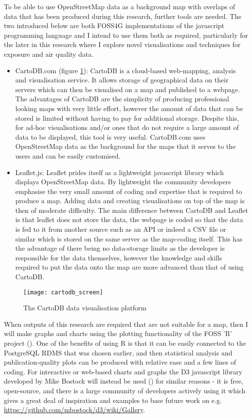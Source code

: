 To be able to use OpenStreetMap data as a background map with overlaps of data that has been produced during this research, further tools are needed. The two introduced below are both FOSS4G implementations of the javascript programming language and I intend to use them both as required, particularly for the later in this research where I explore novel visualisations and techniques for exposure and air quality data. 

\begin{itemize}
\item CartoDB.com (figure \ref{fig:cartodb_screen}): CartoDB is a cloud-based web-mapping, analysis and visualisation service. It allows storage of geographical data on their servers which can then be visualised on a map and published to a webpage. The advantages of CartoDB are the simplicity of producing professional looking maps with very little effort, however the amount of data that can be stored is limited without having to pay for additional storage. Despite this, for ad-hoc visualisations and/or ones that do not require a large amount of data to be displayed, this tool is very useful. CartoDB.com uses OpenStreetMap data as the background for the maps that it serves to the users and can be easily customised.
\item Leaflet.js: Leaflet prides itself as a lightweight javascript library which displays OpenStreetMap data. By lightweight the community developers emphasise the very small amount of coding and expertise that is required to produce a map. Adding data and creating visualisations on top of the map is then of moderate difficulty. The main difference between CartoDB and Leaflet is that leaflet does not store the data, the webpage is coded so that the data is fed to it from another source such as an API or indeed a CSV file or similar which is stored on the same server as the map-coding itself. This has the advantage of there being no data-storage limits as the developer is responsible for the data themselves, however the knowledge and skills required to put the data onto the map are more advanced than that of using CartoDB.
\end{itemize}

\begin{figure}[H]
\centering
\texttt{[image: cartodb\_screen]}
\caption{The CartoDB data visualisation platform}
\label{fig:cartodb_screen}
\end{figure}

When outputs of this research are required that are not suitable for a map, then I will make graphs and charts using the plotting functionality of the FOSS 'R' project (\cite{RFoundationforStatisticalComputing2014}). One of the benefits of using R is that it can be easily connected to the PostgreSQL RDMS that was chosen earlier, and then statistical analysis and publication-quality plots can be produced with relative ease and a few lines of coding.  For interactive or web-based charts and graphs the D3 javascript library developed by Mike Bostock will instead be used (\cite{Bostock:2011:DDD:2068462.2068631}) for similar reasons - it is free, open-source, and there is a large community of developers actively using it which gives a great deal of inspiration and examples to base future work on e.g. \url{https://github.com/mbostock/d3/wiki/Gallery}.
